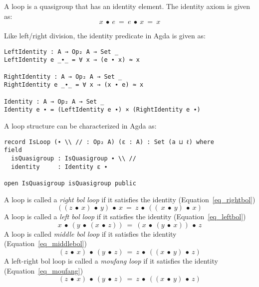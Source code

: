 A loop is a quasigroup that has an identity element. The identity axiom is given
as:
\begin{equation}\label{eq_lineslope}
x\ ∙\ e\ =\ e\ ∙\ x\ =\ x
\end{equation}

Like left/right division, the identity predicate in Agda is given as:

\begin{verbatim}
LeftIdentity : A → Op₂ A → Set _
LeftIdentity e _∙_ = ∀ x → (e ∙ x) ≈ x

RightIdentity : A → Op₂ A → Set _
RightIdentity e _∙_ = ∀ x → (x ∙ e) ≈ x

Identity : A → Op₂ A → Set _
Identity e ∙ = (LeftIdentity e ∙) × (RightIdentity e ∙)
\end{verbatim}

A loop structure can be characterized in Agda as:

\begin{verbatim}
record IsLoop (∙ \\ // : Op₂ A) (ε : A) : Set (a ⊔ ℓ) where
field
  isQuasigroup : IsQuasigroup ∙ \\ //
  identity     : Identity ε ∙

open IsQuasigroup isQuasigroup public
\end{verbatim}

A loop is called a \textit{right bol loop} if it satisfies the identity
(Equation~\ref{eq_rightbol})
\begin{equation}\label{eq_rightbol}
 ((z\ ∙\ x)\ ∙\ y)\ ∙\ x\ =\ z\ ∙\ ((\ x\ ∙\ y)\ ∙\ x)
\end{equation}
A loop is called a \textit{left bol loop} if it satisfies the identity
(Equation~\ref{eq_leftbol})
\begin{equation}\label{eq_leftbol}
 x\ ∙\ (y\ ∙\ (x\ ∙\ z))\ =\ (x\ ∙\ (y\ ∙\ x))\ ∙\ z
\end{equation}
A loop is called \textit{middle bol loop} if it satisfies the identity
(Equation~\ref{eq_middlebol}) 
\begin{equation}\label{eq_middlebol}
(z\ ∙\ x)\ ∙\ (y\ ∙\ z)\ =\ z\ ∙\ ((x\ ∙\ y)\ ∙\ z)
\end{equation}
A left-right bol loop is called a \textit{moufang loop} if it satisfies the
identity (Equation~\ref{eq_moufang})
\begin{equation}\label{eq_moufang}
(z\ ∙\ x)\ ∙\ (y\ ∙\ z)\ =\ z\ ∙\ ((x\ ∙\ y)\ ∙\ z)
\end{equation} 

